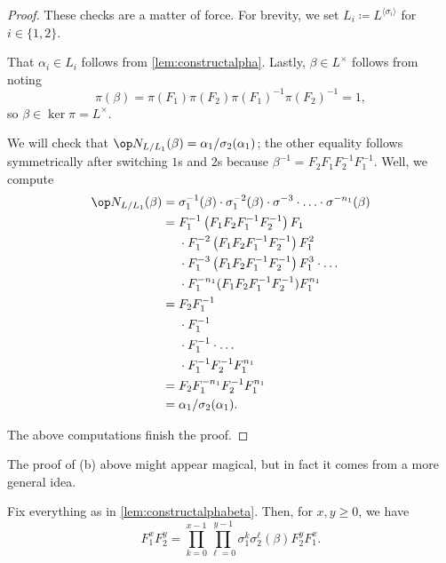 \documentclass{article}
\numberwithin{equation}{section}
\begin{document}
\begin{proof}
	These checks are a matter of force. For brevity, we set $L_i\coloneqq L^{\langle\sigma_i\rangle}$ for $i\in\{1,2\}$.
	\begin{listalph}
		\item That $\alpha_i\in L_i$ follows from \autoref{lem:constructalpha}. Lastly, $\beta\in L^\times$ follows from noting
		\[\pi(\beta)=\pi(F_1)\pi(F_2)\pi(F_1)^{-1}\pi(F_2)^{-1}=1,\]
		so $\beta\in\ker\pi=L^\times$.
		\item We will check that $\op N_{L/L_1}(\beta)=\alpha_1/\sigma_2(\alpha_1)$; the other equality follows symmetrically after switching $1$s and $2$s because $\beta^{-1}=F_2F_1F_2^{-1}F_1^{-1}$. Well, we compute
		\begin{align*}
			\op N_{L/L_1}(\beta) &= \sigma_1^{-1}(\beta)\cdot\sigma_1^{-2}(\beta)\cdot\sigma^{-3}\cdot\ldots\cdot\sigma^{-n_1}(\beta) \\
			&= F_1^{-1}\left(F_1F_2F_1^{-1}F_2^{-1}\right)F_1 \\
			&\phantom{{}={}}\cdot F_1^{-2}\left(F_1F_2F_1^{-1}F_2^{-1}\right)F_1^2 \\
			&\phantom{{}={}}\cdot F_1^{-3}\left(F_1F_2F_1^{-1}F_2^{-1}\right)F_1^3\cdot\ldots \\
			&\phantom{{}={}}\cdot F_1^{-n_1}(F_1F_2F_1^{-1}F_2^{-1})F_1^{n_1} \\
			&= F_2F_1^{-1} \\
			&\phantom{{}={}}\cdot F_1^{-1} \\
			&\phantom{{}={}}\cdot F_1^{-1}\cdot\ldots \\
			&\phantom{{}={}}\cdot F_1^{-1}F_2^{-1}F_1^{n_1} \\
			&= F_2F_1^{-n_1}F_2^{-1}F_1^{n_1} \\
			&= \alpha_1/\sigma_2(\alpha_1).
		\end{align*}
	\end{listalph}
	The above computations finish the proof.
\end{proof}
The proof of (b) above might appear magical, but in fact it comes from a more general idea.
\begin{lemma} \label{lem:switchtwo}
	Fix everything as in \autoref{lem:constructalphabeta}. Then, for $x,y\ge0$, we have
	\[F_1^xF_2^y=\prod_{k=0}^{x-1}\prod_{\ell=0}^{y-1}\sigma_1^k\sigma_2^\ell(\beta)F_2^yF_1^x.\]
\end{lemma}
\end{document}
